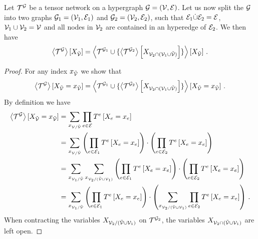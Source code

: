 \begin{theorem}\label{the:splittingContractions}
	Let $\mathcal{T}^{\mathcal{G}}$ be a tensor network on a hypergraph $\mathcal{G}=(\mathcal{V},\mathcal{E})$.
	Let us now split the $\mathcal{G}$ into two graphs $\mathcal{G}_1=(\mathcal{V}_1,\mathcal{E}_1)$ and $\mathcal{G}_2=(\mathcal{V}_2,\mathcal{E}_2)$, such that $\mathcal{E}_1\dot{\cup}\mathcal{E}_2=\mathcal{E}$, $\mathcal{V}_1\cup\mathcal{V}_2=\mathcal{V}$ and all nodes in $\mathcal{V}_2$ are contained in an hyperedge of $\mathcal{E}_2$.
	We then have
	\begin{align*}
 \left\langle \mathcal{T}^{\mathcal{G}}\right\rangle \left[ X_{\tilde{\mathcal{V}}} \right]
		=
		\left\langle \mathcal{T}^{\mathcal{G}_1} \cup \{
			\left\langle \mathcal{T}^{\mathcal{G}_2}\right\rangle \left[ X_{\mathcal{V}_2\cap(\mathcal{V}_1\cup\tilde{\mathcal{V}})} \right]
		\}\right\rangle \left[ X_{\tilde{\mathcal{V}}} \right]   \, .
\end{align*}
\end{theorem}
\begin{proof}
	For any index $x_{\tilde{\mathcal{V}}}$ we show that
			\[ \left\langle \mathcal{T}^{\mathcal{G}}\right\rangle \left[ X_{\tilde{\mathcal{V}}}=x_{\tilde{\mathcal{V}}} \right]
		=
		\left\langle \mathcal{T}^{\mathcal{G}_1} \cup \{
			\left\langle \mathcal{T}^{\mathcal{G}_2}\right\rangle \left[ X_{\mathcal{V}_2\cap(\mathcal{V}_1\cup\tilde{\mathcal{V}})} \right]
		\}\right\rangle \left[ X_{\tilde{\mathcal{V}}}=x_{\tilde{\mathcal{V}}} \right]   \, . \]
	By definition we have
	\begin{align*}
		\left\langle \mathcal{T}^{\mathcal{G}}\right\rangle \left[ X_{\tilde{\mathcal{V}}}=x_{\tilde{\mathcal{V}}} \right]
		& = \sum_{x_{\mathcal{V}/\tilde{\mathcal{V}}}} \prod_{e\in\mathcal{E}} T^{e}\left[X_{e}=x_{e}\right] \\
		& = \sum_{x_{\mathcal{V}/\tilde{\mathcal{V}}}}
		 	\left( \prod_{e\in\mathcal{E}_1} T^{e}\left[X_{e}=x_{e}\right] \right)
		 	\cdot \left( \prod_{e\in\mathcal{E}_2} T^{e}\left[X_{e}=x_{e}\right]  \right) \\
		& =  \sum_{x_{\mathcal{V}_1/\tilde{\mathcal{V}}}} \sum_{x_{\mathcal{V}_2/(\tilde{\mathcal{V}}\cup\mathcal{V}_1)}}
			\left( \prod_{e\in\mathcal{E}_1} T^{e}\left[X_{e}=x_{e}\right] \right)
		 	\cdot \left( \prod_{e\in\mathcal{E}_2} T^{e}\left[X_{e}=x_{e}\right]  \right) \\
		& =  \sum_{x_{\mathcal{V}_1/\tilde{\mathcal{V}}}}
			\left( \prod_{e\in\mathcal{E}_1} T^{e}\left[X_{e}=x_{e}\right] \right)
		 	\cdot \left( \sum_{x_{\mathcal{V}_2/(\tilde{\mathcal{V}}\cup\mathcal{V}_1)}}  \prod_{e\in\mathcal{E}_2} T^{e}\left[X_{e}=x_{e}\right]  \right) \, .
	\end{align*}
	When contracting the variables $X_{\mathcal{V}_2/(\tilde{\mathcal{V}}\cup\mathcal{V}_1)}$ on $\mathcal{T}^{\mathcal{G}_2}$, the variables $X_{\mathcal{V}_2\cap(\tilde{\mathcal{V}}\cup\mathcal{V}_1)}$ are left open.

\end{proof}
